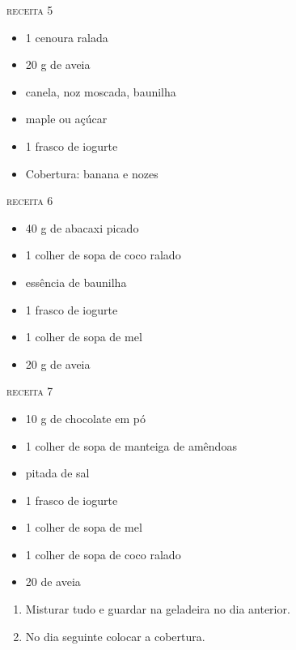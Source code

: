 {\textsc{receita 5}
\begin{itemize}
    \item 1 cenoura ralada
    \item 20 g de aveia
    \item canela, noz moscada, baunilha
    \item maple ou açúcar
    \item 1 frasco de iogurte
    \item Cobertura: banana e nozes
\end{itemize}

\textsc{receita 6}
\begin{itemize}
    \item 40 g de abacaxi picado
    \item 1 colher de sopa de coco ralado
    \item essência de baunilha
    \item 1 frasco de iogurte
    \item 1 colher de sopa de mel
    \item 20 g de aveia
\end{itemize}

\textsc{receita 7}
\begin{itemize}
    \item 10 g de chocolate em pó
    \item 1 colher de sopa de manteiga de amêndoas
    \item pitada de sal
    \item 1 frasco de iogurte
    \item 1 colher de sopa de mel
    \item 1 colher de sopa de coco ralado
    \item 20 de aveia
\end{itemize}
} {\begin{enumerate} 
    \item Misturar tudo e guardar na geladeira no dia anterior. 
    \item No dia seguinte colocar a cobertura. 
\end{enumerate} } 

